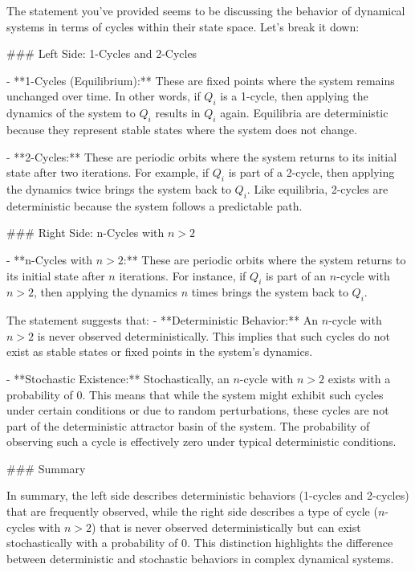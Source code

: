 The statement you've provided seems to be discussing the behavior of dynamical systems in terms of cycles within their state space. Let's break it down:

### Left Side: 1-Cycles and 2-Cycles

- **1-Cycles (Equilibrium):** These are fixed points where the system remains unchanged over time. In other words, if \( Q_i \) is a 1-cycle, then applying the dynamics of the system to \( Q_i \) results in \( Q_i \) again. Equilibria are deterministic because they represent stable states where the system does not change.

- **2-Cycles:** These are periodic orbits where the system returns to its initial state after two iterations. For example, if \( Q_i \) is part of a 2-cycle, then applying the dynamics twice brings the system back to \( Q_i \). Like equilibria, 2-cycles are deterministic because the system follows a predictable path.

### Right Side: n-Cycles with \( n > 2 \)

- **n-Cycles with \( n > 2 \):** These are periodic orbits where the system returns to its initial state after \( n \) iterations. For instance, if \( Q_i \) is part of an \( n \)-cycle with \( n > 2 \), then applying the dynamics \( n \) times brings the system back to \( Q_i \).

The statement suggests that:
- **Deterministic Behavior:** An \( n \)-cycle with \( n > 2 \) is never observed deterministically. This implies that such cycles do not exist as stable states or fixed points in the system's dynamics.
  
- **Stochastic Existence:** Stochastically, an \( n \)-cycle with \( n > 2 \) exists with a probability of 0. This means that while the system might exhibit such cycles under certain conditions or due to random perturbations, these cycles are not part of the deterministic attractor basin of the system. The probability of observing such a cycle is effectively zero under typical deterministic conditions.

### Summary

In summary, the left side describes deterministic behaviors (1-cycles and 2-cycles) that are frequently observed, while the right side describes a type of cycle (\( n \)-cycles with \( n > 2 \)) that is never observed deterministically but can exist stochastically with a probability of 0. This distinction highlights the difference between deterministic and stochastic behaviors in complex dynamical systems.